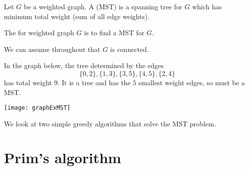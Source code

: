 \begin{Definition}
Let $G$ be a weighted graph. A  (MST) 
is a spanning tree for $G$ which has minimum total weight 
(sum of all edge weights). 
\end{Definition}


The  for weighted graph $G$ is to find a MST for $G$. 

We can assume throughout that $G$ is connected.


\begin{Boxample}
In the graph below, the tree determined by the edges
$$\{0, 2\}, \{1, 3\}, \{3, 5\}, \{4, 5\}, \{2, 4\}$$ 
has total weight $9$. 
It is a tree and has the $5$ smallest weight edges, so must be a MST.
\begin{center}
  \texttt{[image: graphExMST]}
\end{center}
\end{Boxample}


We look at two simple greedy algorithms that solve the MST problem.

\section{Prim's algorithm}


